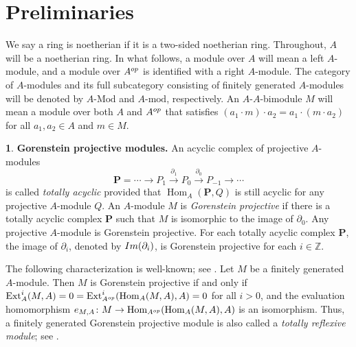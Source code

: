 \documentclass{amsart}
\newcommand{\Z}{\mathbb{Z}}
\newcommand{\0}{{\bf{0}}}
\DeclareMathOperator{\Hom}{Hom}
\DeclareMathOperator{\Ext}{Ext}
\theoremstyle{definition}
\newtheorem{chunk}[theorem]{}
\begin{document}


\section{Preliminaries}

We say a ring is noetherian if it is a two-sided noetherian ring.
 Throughout, $A$ will be a noetherian ring. In what follows,  a module over $A$ will mean a left $A$-module, and a module over $A^{\rm op}$  is identified with a right $A$-module. The category of $A$-modules and its full subcategory consisting of finitely generated $A$-modules will be denoted by $A\mbox{-Mod}$ and $A\mbox{-mod}$, respectively. An $A\mbox{-}A$-bimodule $M$ will mean a module over both $A$ and $A^{\rm op}$ that satisfies $(a_1\cdot m)\cdot a_2=a_1\cdot (m\cdot a_2)$ for all $a_1,a_2\in A$ and $m\in M$.


\begin{chunk}\label{gp}
\textbf{Gorenstein projective modules.} An acyclic complex of projective  $A$-modules
 $$
 \mathbf{P}  = \cdots \longrightarrow P_{1}\stackrel{\partial_{1}}\longrightarrow P_0\stackrel{\partial_0}\longrightarrow P_{-1}\longrightarrow\cdots
 $$
is called \emph{totally acyclic} provided that $\Hom_A(\mathbf{P}, Q)$ is still acyclic for any projective $A$-module $Q$. An $A$-module $M$ is \emph{Gorenstein projective} if there is a totally acyclic complex $\mathbf{P}$ such that $M$ is isomorphic to the image of $\partial_0$. Any projective  $A$-module is Gorenstein projective. For each totally acyclic complex $\mathbf{P}$, the image of $\partial_i$, denoted by ${\rm Im}(\partial_i)$, is Gorenstein projective for each $i\in \Z$.

The following characterization is well-known; see \cite[Proposition 3.8]{AB}. Let $M$ be a finitely generated  $A$-module. Then $M$ is Gorenstein projective if and only if $\Ext^{i}_A(M, A) = 0 = \Ext^{i}_{A^{\rm op}}(\Hom_A(M,A),A)=0$ for all $i>0$, and the evaluation homomorphism ${\rm e}_{M,A}\colon M\rightarrow \Hom_{A^{\rm op}}(\Hom_A(M,A),A)$ is an isomorphism. Thus, a finitely generated Gorenstein projective module is also called a {\em totally reflexive module}; see \cite{AM}.
\end{chunk}
\end{document}
